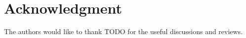 \documentclass[conference]{IEEEtran}
\begin{document}
\section*{Acknowledgment}
The authors would like to thank TODO for the useful discussions and reviews.






%
%
%




\end{document}
